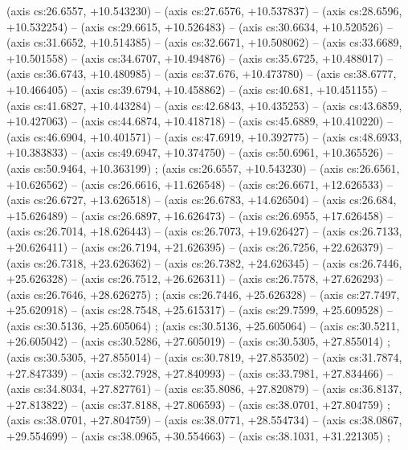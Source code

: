     (axis cs:26.6557,    +10.543230) --  (axis cs:27.6576,    +10.537837) --  (axis cs:28.6596,    +10.532254) --  (axis cs:29.6615,    +10.526483) --  (axis cs:30.6634,    +10.520526) --  (axis cs:31.6652,    +10.514385) --  (axis cs:32.6671,    +10.508062) --  (axis cs:33.6689,    +10.501558) --  (axis cs:34.6707,    +10.494876) --  (axis cs:35.6725,    +10.488017) --  (axis cs:36.6743,    +10.480985) --  (axis cs:37.676,    +10.473780) --  (axis cs:38.6777,    +10.466405) --  (axis cs:39.6794,    +10.458862) --  (axis cs:40.681,    +10.451155) --  (axis cs:41.6827,    +10.443284) --  (axis cs:42.6843,    +10.435253) --  (axis cs:43.6859,    +10.427063) --  (axis cs:44.6874,    +10.418718) --  (axis cs:45.6889,    +10.410220) --  (axis cs:46.6904,    +10.401571) --  (axis cs:47.6919,    +10.392775) --  (axis cs:48.6933,    +10.383833) --  (axis cs:49.6947,    +10.374750) --  (axis cs:50.6961,    +10.365526) --  (axis cs:50.9464,    +10.363199) ;
    (axis cs:26.6557,    +10.543230) --  (axis cs:26.6561,    +10.626562) --  (axis cs:26.6616,    +11.626548) --  (axis cs:26.6671,    +12.626533) --  (axis cs:26.6727,    +13.626518) --  (axis cs:26.6783,    +14.626504) --  (axis cs:26.684,    +15.626489) --  (axis cs:26.6897,    +16.626473) --  (axis cs:26.6955,    +17.626458) --  (axis cs:26.7014,    +18.626443) --  (axis cs:26.7073,    +19.626427) --  (axis cs:26.7133,    +20.626411) --  (axis cs:26.7194,    +21.626395) --  (axis cs:26.7256,    +22.626379) --  (axis cs:26.7318,    +23.626362) --  (axis cs:26.7382,    +24.626345) --  (axis cs:26.7446,    +25.626328) --  (axis cs:26.7512,    +26.626311) --  (axis cs:26.7578,    +27.626293) --  (axis cs:26.7646,    +28.626275) ;
    (axis cs:26.7446,    +25.626328) --  (axis cs:27.7497,    +25.620918) --  (axis cs:28.7548,    +25.615317) --  (axis cs:29.7599,    +25.609528) --  (axis cs:30.5136,    +25.605064) ;
    (axis cs:30.5136,    +25.605064) --  (axis cs:30.5211,    +26.605042) --  (axis cs:30.5286,    +27.605019) --  (axis cs:30.5305,    +27.855014) ;
    (axis cs:30.5305,    +27.855014) --  (axis cs:30.7819,    +27.853502) --  (axis cs:31.7874,    +27.847339) --  (axis cs:32.7928,    +27.840993) --  (axis cs:33.7981,    +27.834466) --  (axis cs:34.8034,    +27.827761) --  (axis cs:35.8086,    +27.820879) --  (axis cs:36.8137,    +27.813822) --  (axis cs:37.8188,    +27.806593) --  (axis cs:38.0701,    +27.804759) ;
    (axis cs:38.0701,    +27.804759) --  (axis cs:38.0771,    +28.554734) --  (axis cs:38.0867,    +29.554699) --  (axis cs:38.0965,    +30.554663) --  (axis cs:38.1031,    +31.221305) ;
